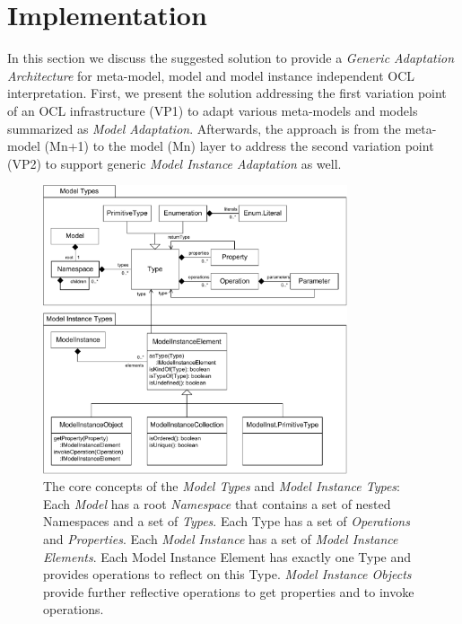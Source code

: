 \section{Implementation}

	In this section we discuss the suggested solution to provide a \emph{Generic Adaptation Architecture} for 
	meta-model, model and model instance independent OCL interpretation. First, we present the solution addressing
	the first variation point of an OCL infrastructure (VP1) to
	adapt	various meta-models and models summarized as \emph{Model Adaptation}. Afterwards, the approach is  
	from the meta-model (Mn+1) to the model (Mn) layer to address the second variation point (VP2) to support 
	generic \emph{Model Instance Adaptation} as well.
	
	\begin{figure}[!t]
			\centering
				\includegraphics[width=0.80\textwidth]{figures/coreconcepts.pdf}
			\caption{The core concepts of the \emph{Model Types} and \emph{Model Instance Types}:
			Each \emph{Model} has a root \emph{Namespace} that contains a set of nested Namespaces and 
			a set of \emph{Types}. Each Type has a set of \emph{Operations} 
			and \emph{Properties}. 
			Each \emph{Model Instance} has a set of \emph{Model Instance Elements}. Each Model Instance
			Element has exactly one Type and provides 
			operations to reflect on this Type. \emph{Model Instance Objects} provide further reflective 
			operations to get properties and to invoke operations.}
			\label{fig:coreconcepts}
		\end{figure}

